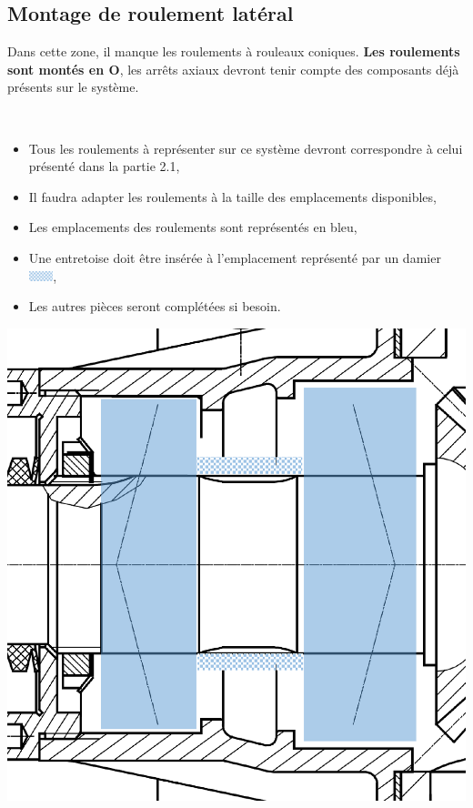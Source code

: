 \subsection{Montage de roulement latéral}

Dans cette zone, il manque les roulements à rouleaux coniques. \textbf{Les roulements sont montés en O}, les arrêts axiaux devront tenir compte des composants déjà présents sur le système.

~\ \\
\begin{minipage}{0.6\linewidth}
\begin{itemize}
 \item Tous les roulements à représenter sur ce système devront correspondre à celui présenté dans la partie 2.1,
 \item Il faudra adapter les roulements à la taille des emplacements disponibles,
 \item Les emplacements des roulements sont représentés en bleu,
 \item Une entretoise doit être insérée à l'emplacement représenté par un damier \includegraphics[width=0.7cm]{img/dames},
 \item Les autres pièces seront complétées si besoin.
\end{itemize}
\end{minipage}\hfill
\begin{minipage}{0.35\linewidth}
\begin{center}
 \includegraphics[width=0.8\linewidth]{img/fig1.pdf}
\end{center}
\end{minipage}

